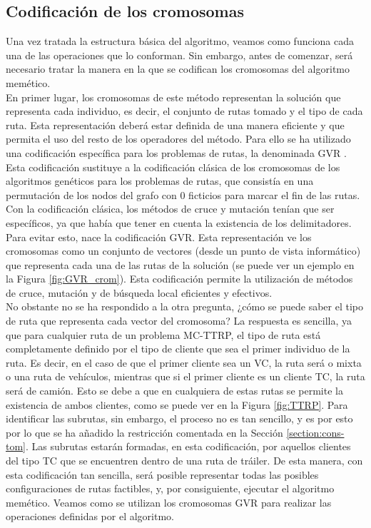 \subsection{Codificación de los cromosomas}
Una vez tratada la estructura básica del algoritmo, veamos como funciona cada una de las operaciones que lo conforman. Sin embargo, antes de comenzar, será necesario tratar la manera en la que se codifican los cromosomas del algoritmo memético.\\

En primer lugar, los cromosomas de este método representan la solución que representa cada individuo, es decir, el conjunto de rutas tomado y el tipo de cada ruta. Esta representación deberá estar definida de una manera eficiente y que permita el uso del resto de los operadores del método. Para ello se ha utilizado una codificación específica para los problemas de rutas, la denominada GVR \cite{gvr}. Esta codificación sustituye a la codificación clásica de los cromosomas de los algoritmos genéticos para los problemas de rutas, que consistía en una permutación de los nodos del grafo con $0$ ficticios para marcar el fin de las rutas. Con la codificación clásica, los métodos de cruce y mutación tenían que ser específicos, ya que había que tener en cuenta la existencia de los delimitadores. Para evitar esto, nace la codificación GVR. Esta representación ve los cromosomas como un conjunto de vectores (desde un punto de vista informático) que representa cada una de las rutas de la solución (se puede ver un ejemplo en la Figura \ref{fig:GVR_crom}). Esta codificación permite la utilización de métodos de cruce, mutación y de búsqueda local eficientes y efectivos. \\

No obstante no se ha respondido a la otra pregunta, ¿cómo se puede saber el tipo de ruta que representa cada vector del cromosoma? La respuesta es sencilla, ya que para cualquier ruta de un problema MC-TTRP, el tipo de ruta está completamente definido por el tipo de cliente que sea el primer individuo de la ruta. Es decir, en el caso de que el primer cliente sea un VC, la ruta será o mixta o una ruta de vehículos, mientras que si el primer cliente es un cliente TC, la ruta será de camión. Esto se debe a que en cualquiera de estas rutas se permite la existencia de ambos clientes, como se puede ver en la Figura \ref{fig:TTRP}. Para identificar las subrutas, sin embargo, el proceso no es tan sencillo, y es por esto por lo que se ha añadido la restricción comentada en la Sección \ref{section:cons-tom}. Las subrutas estarán formadas, en esta codificación, por aquellos clientes del tipo TC que se encuentren dentro de una ruta de tráiler. De esta manera, con esta codificación tan sencilla, será posible representar todas las posibles configuraciones de rutas factibles, y, por consiguiente, ejecutar el algoritmo memético. Veamos como se utilizan los cromosomas GVR para realizar las operaciones definidas por el algoritmo.

